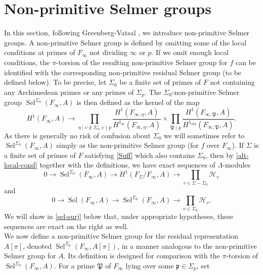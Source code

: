\documentclass[12 pt]{amsart}
\theoremstyle{plain}
\theoremstyle{definition}
\numberwithin{equation}{section}
\numberwithin{table}{section}
\begin{document}
\section{Non-primitive Selmer groups}
\label{non-prim-selmer}
\indent In this section, following Greenberg-Vatsal \cite{GV00}, we introduce non-primitive Selmer groups. A non-primitive Selmer group is defined by omitting some of the local conditions at primes of $F_\infty$ not dividing $\infty$ or $p$. If we omit enough local conditions, the $\pi$-torsion of the resulting non-primitive Selmer group for $f$ can be identified with the corresponding non-primitive residual Selmer group (to be defined below). To be precise, let $\Sigma_0$ be a finite set of primes of $F$ not containing any Archimedean primes or any primes of $\Sigma_p$. The $\Sigma_0$-non-primitive Selmer group $\operatorname{Sel}^{\Sigma_0}(F_\infty,A)$ is then defined as the kernel of the map
\begin{equation*}
H^1(F_\infty,A)\rightarrow\prod_{\eta\mid v\notin\Sigma_0,v\nmid p}\dfrac{H^1(F_{\infty,\eta},A)}{H^1_\operatorname{ur}(F_{\infty,\eta},A)}\times\prod_{\mathfrak{P}\mid p}\dfrac{
H^1(F_{\infty,\mathfrak{P}},A)}{H^1_\operatorname{ord}(F_{\infty,\mathfrak{P}},A)}\text{.}
\end{equation*}
As there is generally no risk of confusion about $\Sigma_0$ we will sometimes refer to $\operatorname{Sel}^{\Sigma_0}(F_\infty,A)$ simply as the non-primitive Selmer group (for $f$ over $F_\infty$). If $\Sigma$ is a finite set of primes of $F$ satisfying \cref{Suff} which also contains $\Sigma_0$, then by \cref{alt-local-cond} together with the definitions, we have exact sequences of $\Lambda$-modules
\begin{equation*}
0\rightarrow\operatorname{Sel}^{\Sigma_0}(F_\infty,A)\rightarrow H^1(F_\Sigma/F_\infty,A)\rightarrow\prod_{v\in\Sigma-\Sigma_0}\mathcal{H}_v
\end{equation*}
and
\begin{equation*}
0\rightarrow\operatorname{Sel}(F_\infty,A)\rightarrow\operatorname{Sel}^{\Sigma_0}(F_\infty,A)\rightarrow\prod_{v\in\Sigma_0}\mathcal{H}_v\text{.}
\end{equation*}
We will show in \cref{sel-surj} below that, under appropriate hypotheses, these sequences are exact on the right as well. \\%
\indent We now define a non-primitive Selmer group for the residual representation $A[\pi]$, denoted $\operatorname{Sel}^{\Sigma_0}(F_\infty,A[\pi])$, in a manner analogous to the non-primitive Selmer group for $A$. Its definition is designed for comparison with the $\pi$-torsion of $\operatorname{Sel}^{\Sigma_0}(F_\infty,A)$. For a prime $\mathfrak{P}$ of $F_\infty$ lying over some $\mathfrak{p}\in\Sigma_p$, set
\end{document}
